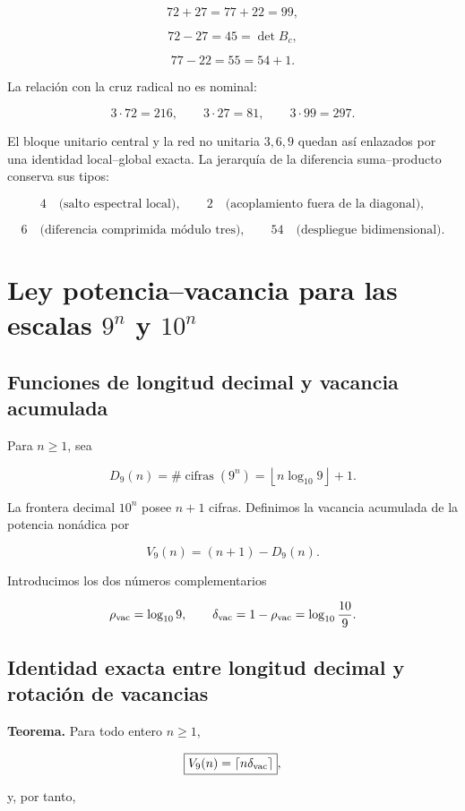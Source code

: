\[
72+27=77+22=99,
\]

\[
72-27=45=\det B_c,
\]

\[
77-22=55=54+1.
\]

La relación con la cruz radical no es nominal:

\[
3\cdot72=216,
\qquad
3\cdot27=81,
\qquad
3\cdot99=297.
\]

El bloque unitario central y la red no unitaria \(3,6,9\) quedan así enlazados por una identidad local–global exacta. La jerarquía de la diferencia suma–producto conserva sus tipos:

\[
4\quad\text{(salto espectral local)},\qquad
2\quad\text{(acoplamiento fuera de la diagonal)},
\]

\[
6\quad\text{(diferencia comprimida módulo tres)},\qquad
54\quad\text{(despliegue bidimensional)}.
\]


\section{Ley potencia--vacancia para las escalas \texorpdfstring{\(9^n\)}{9 elevado a n} y \texorpdfstring{\(10^n\)}{10 elevado a n}}

\subsection{Funciones de longitud decimal y vacancia acumulada}

Para \(n\ge1\), sea

\[
D_9(n)=\#\operatorname{cifras}(9^n)
=\left\lfloor n\log_{10}9\right\rfloor+1.
\]

La frontera decimal \(10^n\) posee \(n+1\) cifras. Definimos la vacancia acumulada de la potencia nonádica por

\[
V_9(n)=(n+1)-D_9(n).
\]

Introducimos los dos números complementarios

\[
\rho_{\rm vac}=\log_{10}9,
\qquad
\delta_{\rm vac}=1-\rho_{\rm vac}
=\log_{10}\frac{10}{9}.
\]

\subsection{Identidad exacta entre longitud decimal y rotación de vacancias}

\textbf{Teorema.} Para todo entero \(n\ge1\),

\[
\boxed{V_9(n)=\left\lceil n\delta_{\rm vac}\right\rceil},
\]

y, por tanto,

